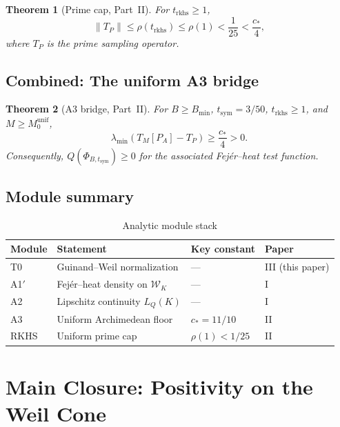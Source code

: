 \documentclass[11pt,a4paper]{article}
\newtheorem{theorem}{Theorem}[section]
\theoremstyle{definition}
\newcommand{\WW}{\mathcal{W}}
\begin{document}
\begin{theorem}[Prime cap, Part~II]\label{thm:prime-cap}
For $t_{\mathrm{rkhs}} \ge 1$,
\[
\|T_P\| \le \rho(t_{\mathrm{rkhs}}) \le \rho(1) < \frac{1}{25} < \frac{c_*}{4},
\]
where $T_P$ is the prime sampling operator.
\end{theorem}

\subsection{Combined: The uniform A3 bridge}

\begin{theorem}[A3 bridge, Part~II]\label{thm:A3-bridge}
For $B \ge B_{\min}$, $t_{\mathrm{sym}} = 3/50$, $t_{\mathrm{rkhs}} \ge 1$, and $M \ge M_0^{\mathrm{unif}}$,
\[
\lambda_{\min}(T_M[P_A] - T_P) \ge \frac{c_*}{4} > 0.
\]
Consequently, $Q(\Phi_{B,t_{\mathrm{sym}}}) \ge 0$ for the associated Fej\'er--heat test function.
\end{theorem}

\subsection{Module summary}

\begin{table}[h]
\centering
\caption{Analytic module stack}
\label{tab:modules}
\begin{tabular}{llll}
\hline
\textbf{Module} & \textbf{Statement} & \textbf{Key constant} & \textbf{Paper} \\
\hline
T0 & Guinand--Weil normalization & --- & III (this paper) \\
A1$'$ & Fej\'er--heat density on $\WW_K$ & --- & I \\
A2 & Lipschitz continuity $L_Q(K)$ & --- & I \\
A3 & Uniform Archimedean floor & $c_* = 11/10$ & II \\
RKHS & Uniform prime cap & $\rho(1) < 1/25$ & II \\
\hline
\end{tabular}
\end{table}

\section{Main Closure: Positivity on the Weil Cone}\label{sec:closure}
\end{document}
